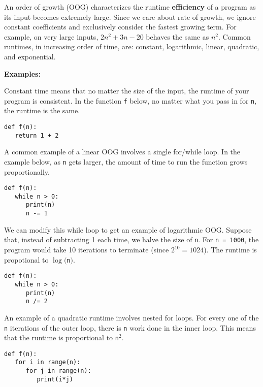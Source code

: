 An order of growth (OOG) characterizes the runtime \textbf{efficiency} of a program as its input becomes extremely large. Since we care about rate of growth, we ignore constant coefficients and exclusively consider the fastest growing term. For example, on very large inputs, $2n^2 + 3n - 20$ behaves the same as $n^2$. Common runtimes, in increasing order of time, are: constant, logarithmic, linear, quadratic, and exponential.

\textbf{Examples:}

Constant time means that no matter the size of the input, the runtime of your program is consistent. In the function \lstinline{f} below, no matter what you pass in for \lstinline{n}, the runtime is the same. \\
\begin{lstlisting}
def f(n):
   return 1 + 2
\end{lstlisting}
A common example of a linear OOG involves a single for/while loop. In the example below, as \lstinline{n} gets larger, the amount of time to run the function grows proportionally. \\
\begin{lstlisting}
def f(n):
   while n > 0:
      print(n)
      n -= 1
\end{lstlisting}
We can modify this while loop to get an example of logarithmic OOG. Suppose that, instead of subtracting 1 each time, we halve the size of \lstinline{n}. For \lstinline{n = 1000}, the program would take 10 iterations to terminate (since $2^10 = 1024$). The runtime is propotional to $\log($\lstinline{n}$)$.
\begin{lstlisting}
def f(n):
   while n > 0:
      print(n)
      n /= 2
\end{lstlisting}
An example of a quadratic runtime involves nested for loops. For every one of the \lstinline{n} iterations of the outer loop, there is \lstinline{n} work done in the inner loop. This means that the runtime is proportional to \lstinline{n}$^{2}$. \\
\begin{lstlisting}
def f(n):
   for i in range(n):
      for j in range(n):
         print(i*j)
\end{lstlisting}

